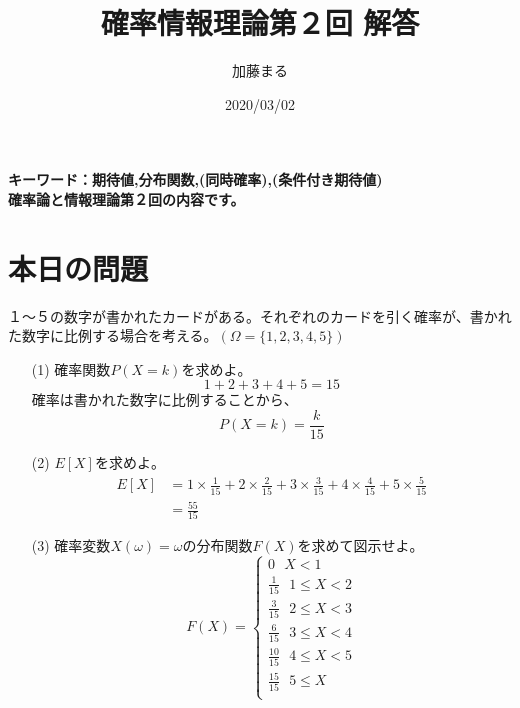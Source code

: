 \documentclass[a4j,uplatex]{jsarticle}
\title{確率情報理論第２回 解答}
\author{加藤まる}
\date{2020/03/02}
\begin{document}
\maketitle
\bf キーワード：期待値,分布関数,(同時確率),(条件付き期待値)
\\
\rm 確率論と情報理論第２回の内容です。

\section*{本日の問題}
１〜５の数字が書かれたカードがある。それぞれのカードを引く確率が、書かれた数字に比例する場合を考える。$(\Omega=\{ 1,2,3,4,5\})$
\begin{itemize}
  \item[(1)] 確率関数$P(X=k)$を求めよ。
  \begin{equation}
      1+2+3+4+5=15
  \end{equation} 
  確率は書かれた数字に比例することから、
  \begin{equation}
    P(X=k)=\frac{k}{15}
  \end{equation}
  \item[(2)] $E[X]$を求めよ。
  \begin{equation}
    \begin{split}
      E[X] &= {1}\times \frac{1}{15}+{2}\times \frac{2}{15}+{3}\times \frac{3}{15}+{4}\times \frac{4}{15}+{5}\times \frac{5}{15} \\
      &=\frac{55}{15}
    \end{split}
  \end{equation} 
  \item[(3)] 確率変数$X(\omega)=\omega$の分布関数$F(X)$を求めて図示せよ。
  \begin{equation}
    F(X)=
    \begin{cases}
      {0~~~X<1}\\
      {\frac{1}{15}~~~1\le X<2}\\
      {\frac{3}{15}~~~2\le X<3}\\
      {\frac{6}{15}~~~3\le X<4}\\
      {\frac{10}{15}~~~4\le X<5}\\
      {\frac{15}{15}~~~5\le X}\\
    \end{cases}
  \end{equation} 
\end{itemize}
\end{document}
